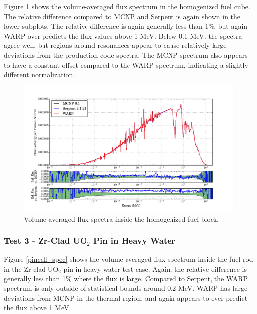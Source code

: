 \documentclass[preprint,12pt]{elsarticle}
\begin{document}
Figure \ref{homfuel_spec} shows the volume-averaged flux spectrum in the homogenized fuel cube.  The relative difference compared to MCNP and Serpent is again shown in the lower subplots.  The relative difference is again generally less than 1\%, but again WARP over-predicts the flux values above 1 MeV.  Below 0.1 MeV, the spectra agree well, but regions around resonances appear to cause relatively large deviations from the production code spectra.  The MCNP spectrum also appears to have a constant offset compared to the WARP spectrum, indicating a slightly different normalization. 

\begin{figure}[h!]
\centering
\includegraphics[width=\textwidth,trim= 1cm 0cm 1cm 0cm]{graphics/homfuel_spec.pdf}
\caption{Volume-averaged flux spectra inside the homogenized fuel block. \label{homfuel_spec} }
\end{figure}

\newpage
\subsubsection{Test 3 - Zr-Clad UO$_2$ Pin in Heavy Water}

Figure \ref{pincell_spec} shows the volume-averaged flux spectrum inside the fuel rod in the Zr-clad UO$_2$ pin in heavy water test case.  Again, the relative difference is generally less than 1\% where the flux is large.  Compared to Serpent, the WARP spectrum is only outside of statistical bounds around 0.2 MeV.   WARP has large deviations from MCNP in the thermal region, and again appears to over-predict the flux above 1 MeV.
\end{document}
